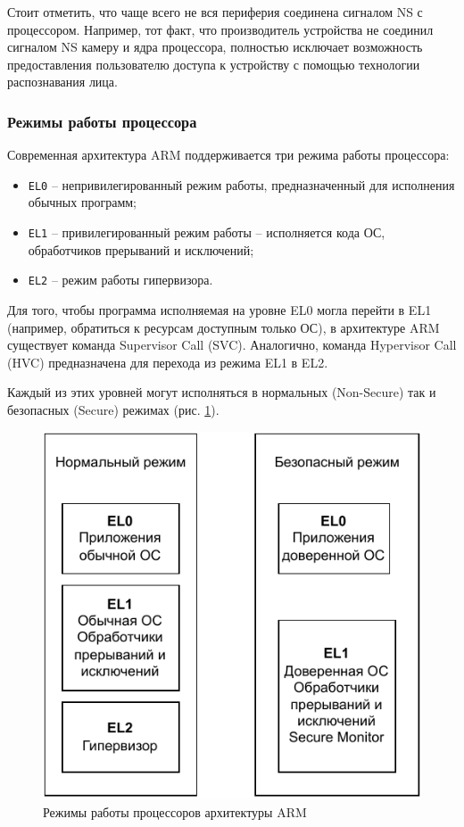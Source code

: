 Стоит отметить, что чаще всего не вся периферия соединена сигналом NS с процессором. Например, тот факт, что производитель устройства не соединил сигналом NS камеру и ядра процессора, полностью исключает возможность предоставления пользователю доступа к устройству с помощью технологии распознавания лица.

\subsubsection{Режимы работы процессора}

Современная архитектура ARM поддерживается три режима работы процессора: 

\begin{itemize}
	\item \texttt{EL0} -- непривилегированный режим работы, предназначенный для исполнения обычных программ;
	\item \texttt{EL1} -- привилегированный режим работы -- исполняется кода ОС, обработчиков прерываний и исключений;
	\item \texttt{EL2} -- режим работы гипервизора.
\end{itemize}

Для того, чтобы программа исполняемая на уровне EL0 могла перейти в EL1 (например, обратиться к ресурсам доступным только ОС), в архитектуре ARM существует команда Supervisor Call (SVC). Аналогично, команда Hypervisor Call (HVC) предназначена для перехода из режима EL1 в EL2.

Каждый из этих уровней могут исполняться в нормальных (Non-Secure) так и безопасных (Secure) режимах (рис. \ref{fig:arm-levels}).

\begin{figure}[h]
	\centering
	\includegraphics[width=\textwidth]{img/arm-levels.pdf}
	\caption{Режимы работы процессоров архитектуры ARM}
	\label{fig:arm-levels}
\end{figure}

